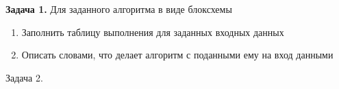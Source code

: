 \documentclass[a4paper,10pt]{article}
\begin{document}
 


\textbf{Задача 1.} Для заданного алгоритма в виде блоксхемы
\begin{enumerate}
 \item Заполнить таблицу выполнения для заданных входных данных
 \item Описать словами, что делает алгоритм с поданными ему на вход данными
\end{enumerate}





\vspace{\fill}
Задача 2.

\vspace{\fill}
\newpage
\end{document}
